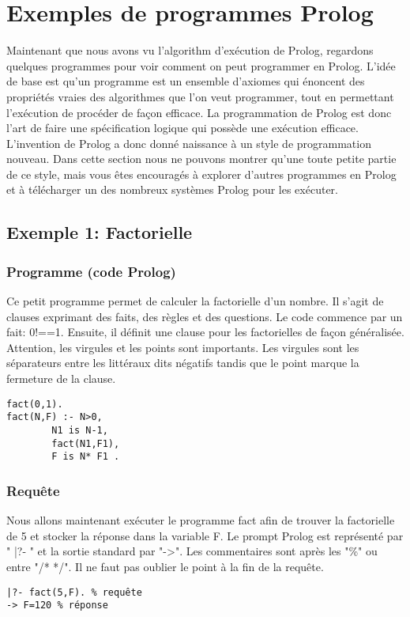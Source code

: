 \section{Exemples de programmes Prolog}

Maintenant que nous avons vu l'algorithm d'exécution de Prolog,
regardons quelques programmes pour voir comment on peut programmer en Prolog.
L'idée de base est qu'un programme est un ensemble d'axiomes qui énoncent des propriétés vraies
des algorithmes que l'on veut programmer, tout en permettant l'exécution de procéder de façon efficace.
La programmation de Prolog est donc l'art de faire une spécification logique qui possède une exécution efficace.
L'invention de Prolog a donc donné naissance à un style de programmation nouveau.
Dans cette section nous ne pouvons montrer qu'une toute petite partie de ce style,
mais vous êtes encouragés à explorer d'autres programmes en Prolog et à télécharger
un des nombreux systèmes Prolog pour les exécuter.

\subsection{Exemple 1: Factorielle}

\subsubsection{Programme (code Prolog)}
Ce petit programme permet de calculer la factorielle d'un nombre. Il s'agit de clauses exprimant des faits, des règles et des questions. Le code commence par un fait: 0!==1. Ensuite, il définit une clause pour les factorielles de façon généralisée. Attention, les virgules et les points sont importants. Les virgules sont les séparateurs entre les littéraux dits négatifs tandis que le point marque la fermeture de la clause.
\begin{verbatim}
fact(0,1).
fact(N,F) :- N>0, 
        N1 is N-1,
        fact(N1,F1), 
        F is N* F1 .
\end{verbatim}

\subsubsection{Requête} Nous allons maintenant exécuter le programme fact afin de trouver la factorielle de 5 et stocker la réponse dans la variable F. Le prompt Prolog est représenté par " |?- " et la sortie standard par "->". Les commentaires sont après les "\%" ou entre "/* */". Il ne faut pas oublier le point à la fin de la requête.
\begin{verbatim} 
|?- fact(5,F). % requête
-> F=120 % réponse
\end{verbatim}

